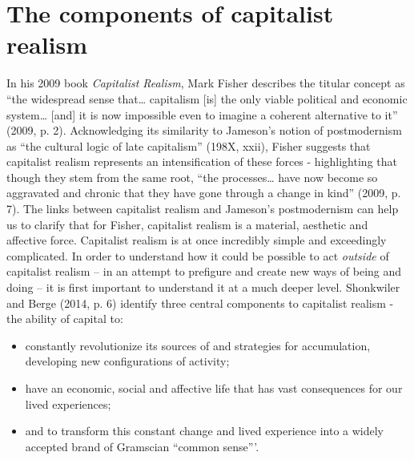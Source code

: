 \section{The components of capitalist realism}
\label{2-components}

In his 2009 book \emph{Capitalist Realism}, Mark Fisher describes the
titular concept as ``the widespread sense that\ldots{} capitalism
{[}is{]} the only viable political and economic system\ldots{} {[}and{]}
it is now impossible even to imagine a coherent alternative to it''
(2009, p. 2). Acknowledging its similarity to Jameson's notion of
postmodernism as ``the cultural logic of late capitalism'' (198X, xxii),
Fisher suggests that capitalist realism represents an intensification of
these forces - highlighting that though they stem from the same root,
``the processes\ldots{} have now become so aggravated and chronic that
they have gone through a change in kind'' (2009, p. 7). The links
between capitalist realism and Jameson's postmodernism can help us to
clarify that for Fisher, capitalist realism is a material, aesthetic and
affective force. Capitalist realism is at once incredibly simple and
exceedingly complicated. In order to understand how it could be possible
to act \emph{outside} of capitalist realism -- in an attempt to
prefigure and create new ways of being and doing -- it is first
important to understand it at a much deeper level. Shonkwiler and Berge
(2014, p. 6) identify three central components to capitalist realism -
the ability of capital to:

\begin{itemize}
\item
  constantly revolutionize its sources of and strategies for
  accumulation, developing new configurations of activity;
\item
  have an economic, social and affective life that has vast consequences
  for our lived experiences;
\item
  and to transform this constant change and lived experience into a
  widely accepted brand of Gramscian ``common sense'''.
\end{itemize}

